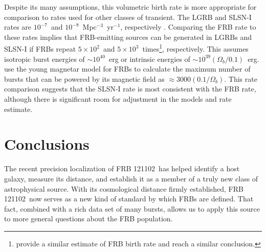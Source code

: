 \documentclass[twocolumn]{aastex61}
\newcommand{\frb}{FRB 121102}
\begin{document}
Despite its many assumptions, this volumetric birth rate is more appropriate for comparison to rates used for other classes of transient. The LGRB and SLSN-I rates are $10^{-7}$\ and $10^{-8}$\ Mpc$^{-3}$\ yr$^{-1}$, respectively \citep{2007ApJ...657L..73G,2012Sci...337..927G}. Comparing the FRB rate to these rates implies that FRB-emitting sources can be generated in LGRBs and SLSN-I if FRBs repeat $5\times10^2$\ and $5\times10^3$\ times\footnote{\citet{2017arXiv170400022N} provide a similar estimate of FRB birth rate and reach a similar conclusion.}, respectively. This assumes isotropic burst energies of $\sim10^{40}$~erg or intrinsic energies of $\sim10^{39} (\Omega_b/0.1)$~erg. \citet{2017arXiv170102370M} use the young magnetar model for FRBs to calculate the maximum number of bursts that can be powered by its magnetic field as $\approx3000 (0.1/\Omega_b)$. This rate comparison suggests that the SLSN-I rate is most consistent with the FRB rate, although there is significant room for adjustment in the models and rate estimate.


\section{Conclusions}

The recent precision localization of \frb\ has helped identify a host galaxy, measure its distance, and establish it as a member of a truly new class of astrophysical source. With its cosmological distance firmly established, \frb\ now serves as a new kind of standard by which FRBs are defined. That fact, combined with a rich data set of many bursts, allows us to apply this source to more general questions about the FRB population.
\end{document}
